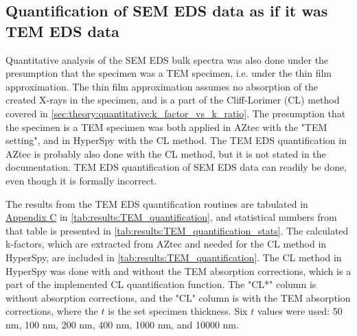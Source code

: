 \subsection{Quantification of SEM EDS data as if it was TEM EDS data}
\label{sec:results:quantification_cliff_lorimer}


Quantitative analysis of the SEM EDS bulk spectra was also done under the presumption that the specimen was a TEM specimen, i.e. under the thin film approximation.
The thin film approximation assumes no absorption of the created X-rays in the specimen, and is a part of the Cliff-Lorimer (CL) method covered in \cref{sec:theory:quantitative:k_factor_vs_k_ratio}.
The presumption that the specimen is a TEM specimen was both applied in AZtec with the "TEM setting", and in HyperSpy with the CL method.
The TEM EDS quantification in AZtec is probably also done with the CL method, but it is not stated in the documentation.
TEM EDS quantification of SEM EDS data can readily be done, even though it is formally incorrect.

The results from the TEM EDS quantification routines are tabulated in \hyperref[appendix:tables]{Appendix C} in \cref{tab:results:TEM_quantification}, and statistical numbers from that table is presented in \cref{tab:results:TEM_quantification_stats}.
The calculated k-factors, which are extracted from AZtec and needed for the CL method in HyperSpy, are included in \cref{tab:results:TEM_quantification}.
The CL method in HyperSpy was done with and without the TEM absorption corrections, which is a part of the implemented CL quantification function.
The "CL*" column is without absorption corrections, and the "CL" column is with the TEM absorption corrections, where the $t$ is the set specimen thickness.
Six $t$ values were used: 50 nm, 100 nm, 200 nm, 400 nm, 1000 nm, and 10000 nm.


